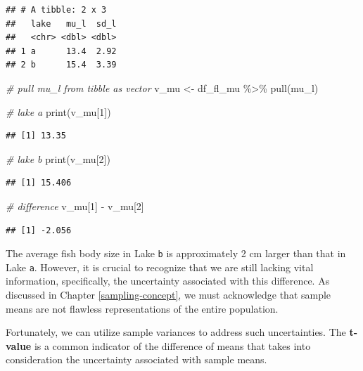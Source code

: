 \documentclass[
]{book}
\newenvironment{Shaded}{\begin{snugshade}}{\end{snugshade}}
\newcommand{\CommentTok}[1]{\textcolor[rgb]{0.56,0.35,0.01}{\textit{#1}}}
\newcommand{\DecValTok}[1]{\textcolor[rgb]{0.00,0.00,0.81}{#1}}
\newcommand{\FunctionTok}[1]{\textcolor[rgb]{0.00,0.00,0.00}{#1}}
\newcommand{\NormalTok}[1]{#1}
\newcommand{\OtherTok}[1]{\textcolor[rgb]{0.56,0.35,0.01}{#1}}
\newcommand{\SpecialCharTok}[1]{\textcolor[rgb]{0.00,0.00,0.00}{#1}}
\begin{document}
\begin{verbatim}
## # A tibble: 2 x 3
##   lake   mu_l  sd_l
##   <chr> <dbl> <dbl>
## 1 a      13.4  2.92
## 2 b      15.4  3.39
\end{verbatim}

\begin{Shaded}
\begin{Highlighting}[]
\CommentTok{\# pull mu\_l from tibble as vector}
\NormalTok{v\_mu }\OtherTok{\textless{}{-}}\NormalTok{ df\_fl\_mu }\SpecialCharTok{\%\textgreater{}\%} 
  \FunctionTok{pull}\NormalTok{(mu\_l)}

\CommentTok{\# lake a}
\FunctionTok{print}\NormalTok{(v\_mu[}\DecValTok{1}\NormalTok{])}
\end{Highlighting}
\end{Shaded}

\begin{verbatim}
## [1] 13.35
\end{verbatim}

\begin{Shaded}
\begin{Highlighting}[]
\CommentTok{\# lake b}
\FunctionTok{print}\NormalTok{(v\_mu[}\DecValTok{2}\NormalTok{])}
\end{Highlighting}
\end{Shaded}

\begin{verbatim}
## [1] 15.406
\end{verbatim}

\begin{Shaded}
\begin{Highlighting}[]
\CommentTok{\# difference}
\NormalTok{v\_mu[}\DecValTok{1}\NormalTok{] }\SpecialCharTok{{-}}\NormalTok{ v\_mu[}\DecValTok{2}\NormalTok{]}
\end{Highlighting}
\end{Shaded}

\begin{verbatim}
## [1] -2.056
\end{verbatim}

The average fish body size in Lake \texttt{b} is approximately 2 cm larger than that in Lake \texttt{a}. However, it is crucial to recognize that we are still lacking vital information, specifically, the uncertainty associated with this difference. As discussed in Chapter \ref{sampling-concept}, we must acknowledge that sample means are not flawless representations of the entire population.

Fortunately, we can utilize sample variances to address such uncertainties. The \textbf{t-value} is a common indicator of the difference of means that takes into consideration the uncertainty associated with sample means.
\end{document}
